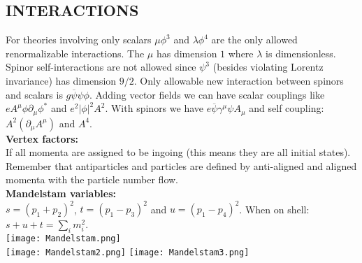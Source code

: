\documentclass[a4paper, norsk, 8pt, landscape]{article}
\begin{document}
\begin{multicols*}{3}
\subsection*{\small  INTERACTIONS}
For theories involving only scalars $\mu \phi^3$ and $\lambda \phi^4$ are the only allowed renormalizable interactions.
The $\mu$ has dimension $1$ where $\lambda$ is dimensionless. Spinor self-interactions are not allowed since $\psi^3$
(besides violating Lorentz invariance) has dimension $9/2$. Only allowable new interaction between spinors and scalars
is $g\overline{\psi}\psi \phi$. Adding vector fields we can have scalar couplings like $eA^\mu \phi \partial_\mu \phi^*$
and $e^2 |\phi|^2 A^2$. With spinors we have $e\overline{\psi}\gamma^\mu \psi A_\mu$ and self coupling:
$A^2(\partial_\mu A^\mu)$ and $A^4$.
\\
 {\textbf{Vertex factors:}} \\
If all momenta are assigned to be ingoing (this means they are all initial states). Remember that antiparticles
and particles are defined by anti-aligned and aligned momenta with the particle number flow.
\\
 {\textbf{Mandelstam variables:}} \\
$s=(p_1+p_2)^2$, $t=(p_1-p_3)^2$ and $u=(p_1-p_4)^2$.
When on shell: $s+u+t=\sum_i m_i^2$. \\
\texttt{[image: Mandelstam.png]}  \\
\texttt{[image: Mandelstam2.png]}
\texttt{[image: Mandelstam3.png]}
















\end{multicols*}
\end{document}
